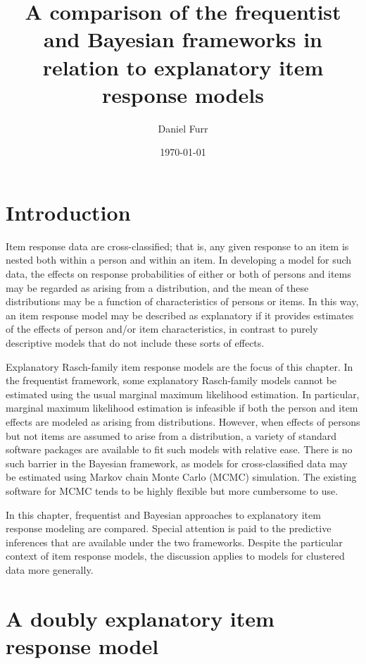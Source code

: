 \documentclass[12pt, letterpaper]{article}
\title{A comparison of the frequentist and Bayesian frameworks in relation to explanatory item response models}
\author{Daniel Furr}
\date{\today}
\begin{document}


\maketitle

\newcommand{\iiiiint}{\int \!\!\! \int \!\!\! \int \!\!\! \int \!\!\! \int}
\newcommand{\iiiiiint}{\int \!\!\! \int \!\!\! \int \!\!\! \int \!\!\! \int \!\!\! \int}


\section{Introduction}

Item response data are cross-classified; that is, any given response to an item is nested both within a person and within an item.
In developing a model for such data, the effects on response probabilities of either or both of persons and items may be regarded as arising from a distribution, and the mean of these distributions may be a function of characteristics of persons or items.
In this way, an item response model may be described as explanatory if it provides estimates of the effects of person and/or item characteristics, in contrast to purely descriptive models that do not include these sorts of effects.

Explanatory Rasch-family item response models are the focus of this chapter. In the frequentist framework, some explanatory Rasch-family models cannot be estimated using the usual marginal maximum likelihood estimation.
In particular, marginal maximum likelihood estimation is infeasible if both the person and item effects are modeled as arising from distributions.
However, when effects of persons but not items are assumed to arise from a distribution, a variety of standard software packages are available to fit such models with relative ease.
There is no such barrier in the Bayesian framework, as models for cross-classified data may be estimated using Markov chain Monte Carlo (MCMC) simulation. The existing software for MCMC tends to be highly flexible but more cumbersome to use.

In this chapter, frequentist and Bayesian approaches to explanatory item response modeling are compared.
Special attention is paid to the predictive inferences that are available under the two frameworks.
Despite the particular context of item response models, the discussion applies to models for clustered data more generally.


\section{A doubly explanatory item response model}
\end{document}
